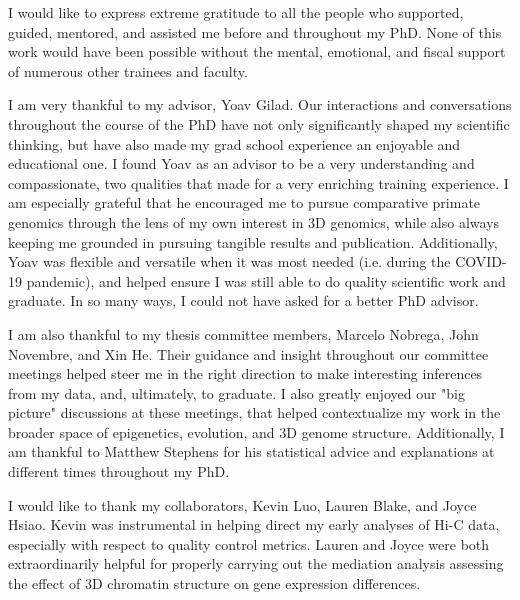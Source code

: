 \acknowledgments

I would like to express extreme gratitude to all the people who supported, guided, mentored, and assisted me before and throughout my PhD. None of this work would have been possible without the mental, emotional, and fiscal support of numerous other trainees and faculty.

I am very thankful to my advisor, Yoav Gilad. Our interactions and conversations throughout the course of the PhD have not only significantly shaped my scientific thinking, but have also made my grad school experience an enjoyable and educational one. I found Yoav as an advisor to be a very understanding and compassionate, two qualities that made for a very enriching training experience. I am especially grateful that he encouraged me to pursue comparative primate genomics through the lens of my own interest in 3D genomics, while also always keeping me grounded in pursuing tangible results and publication. Additionally, Yoav was flexible and versatile when it was most needed (i.e. during the COVID-19 pandemic), and helped ensure I was still able to do quality scientific work and graduate. In so many ways, I could not have asked for a better PhD advisor.

I am also thankful to my thesis committee members, Marcelo Nobrega, John Novembre, and Xin He. Their guidance and insight throughout our committee meetings helped steer me in the right direction to make interesting inferences from my data, and, ultimately, to graduate. I also greatly enjoyed our "big picture" discussions at these meetings, that helped contextualize my work in the broader space of epigenetics, evolution, and 3D genome structure. Additionally, I am thankful to Matthew Stephens for his statistical advice and explanations at different times throughout my PhD.

I would like to thank my collaborators, Kevin Luo, Lauren Blake, and Joyce Hsiao. Kevin was instrumental in helping direct my early analyses of Hi-C data, especially with respect to quality control metrics. Lauren and Joyce were both extraordinarily helpful for properly carrying out the mediation analysis assessing the effect of 3D chromatin structure on gene expression differences.

